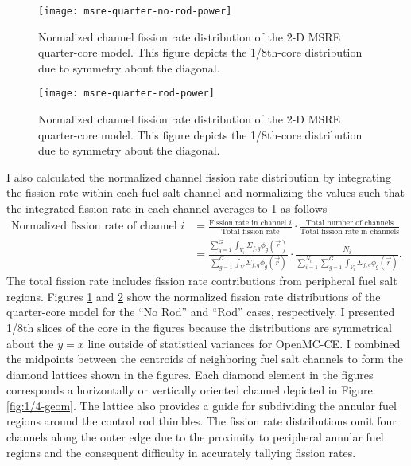 \begin{figure}[p]
  \centering
  \texttt{[image: msre-quarter-no-rod-power]}
  \caption{Normalized channel fission rate distribution of the 2-D \gls{MSRE} quarter-core model.
  This figure depicts the 1/8th-core distribution due to symmetry about the diagonal.}
  \label{fig:1/4-no-rod}
\end{figure}

\begin{figure}[p]
  \centering
  \texttt{[image: msre-quarter-rod-power]}
  \caption{Normalized channel fission rate distribution of the 2-D \gls{MSRE} quarter-core model.
  This figure depicts the 1/8th-core distribution due to symmetry about the diagonal.}
  \label{fig:1/4-rod}
\end{figure}

\FloatBarrier

I also calculated the normalized channel fission rate distribution by integrating the fission rate
within each fuel salt channel and normalizing the values such that the integrated fission rate in
each channel averages to 1 as follows
%
\begin{align}
  \text{Normalized fission rate of channel }i &= \frac{\text{Fission rate in channel }i}{
  \text{Total fission rate}}\cdot\frac{\text{Total number of channels}}{
    \text{Total fission rate in channels}} \nonumber \\
                                              &= \frac{\sum^G_{g=1}\int_{V_i}\Sigma_{f,g}
  \phi_g(\vec{r})}{\sum^G_{g=1}\int_V\Sigma_{f,g}\phi_g(\vec{r})}\cdot\frac{N_i}{
  \sum^{N_i}_{i=1}\sum^G_{g=1}\int_{V_i}\Sigma_{f,g}\phi_g(\vec{r})}.
\end{align}
%
The total fission rate includes fission rate contributions from peripheral fuel salt regions.
Figures \ref{fig:1/4-no-rod} and \ref{fig:1/4-rod} show the normalized fission rate distributions
of the quarter-core model for the ``No Rod'' and ``Rod'' cases, respectively. I presented 1/8th
slices of the core in the figures because the distributions are symmetrical about the $y=x$ line
outside of statistical variances for OpenMC-CE. I combined the midpoints between the centroids of
neighboring fuel salt channels to form the diamond lattices shown in the figures.
Each diamond element in the figures corresponds a horizontally or vertically oriented channel
depicted in Figure \ref{fig:1/4-geom}. The lattice also provides a guide for subdividing the
annular fuel regions around the control rod thimbles. The fission rate
distributions omit four channels along the outer edge due to the proximity to peripheral annular
fuel regions and the consequent difficulty in accurately tallying fission rates.

